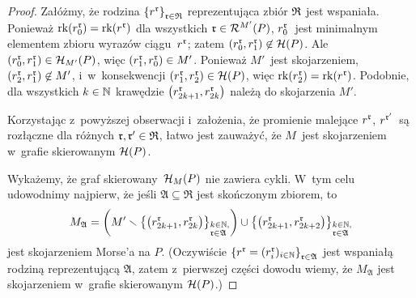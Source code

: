 \begin{proof}
Załóżmy, że rodzina $\left\{r^{\mathfrak{r}}\right\}_{\mathfrak{r}\in\mathfrak{R}}$ reprezentująca zbiór $\mathfrak{R}$ jest wspaniała. Ponieważ $\operatorname{rk}(r^{\mathfrak{r}}_0)=\operatorname{rk}(r^{\mathfrak{r}})$ dla wszystkich $\mathfrak{r}\in\mathcal{R}^{M'}(P)$, $r^{\mathfrak{r}}_0$~jest minimalnym elementem zbioru wyrazów ciągu~$r^{\mathfrak{r}}$; zatem $(r^{\mathfrak{r}}_0,r^{\mathfrak{r}}_1)\not\in\mathcal{H}(P)$. Ale $(r^{\mathfrak{r}}_0,r^{\mathfrak{r}}_1)\in\mathcal{H}_{M'}(P)$, więc $(r^{\mathfrak{r}}_1,r^{\mathfrak{r}}_0)\in M'$. Ponieważ $M'$~jest skojarzeniem, $(r^{\mathfrak{r}}_2,r^{\mathfrak{r}}_1)\not\in M'$, i~w~konsekwencji $(r^{\mathfrak{r}}_1,r^{\mathfrak{r}}_2)\in\mathcal{H}(P)$, więc $\operatorname{rk}(r^{\mathfrak{r}}_2)=\operatorname{rk}(r^{\mathfrak{r}})$. Podobnie, dla wszystkich $k\in\mathbb{N}$ krawędzie $\left(r^{\mathfrak{r}}_{2k+1}, r^{\mathfrak{r}}_{2k}\right)$ należą do skojarzenia $M'$. 

Korzystając z~powyższej obserwacji i~założenia, że promienie malejące $r^{\mathfrak{r}}$, $r^{\mathfrak{r}'}$~są rozłączne dla różnych $\mathfrak{r},\mathfrak{r}'\in\mathfrak{R}$, łatwo jest zauważyć, że $M$~jest skojarzeniem w~grafie skierowanym $\mathcal{H}(P)$.

Wykażemy, że graf skierowany~$\mathcal{H}_{M}(P)$ nie zawiera cykli. W~tym celu udowodnimy najpierw, że jeśli $\mathfrak{A}\subseteq \mathfrak{R}$ jest skończonym zbiorem, to 
\[M_{\mathfrak{A}}=\left(M'\smallsetminus \left\{\left(r^{\mathfrak{r}}_{2k+1}, r^{\mathfrak{r}}_{2k}\right)\right\}_{\begin{subarray}{l}k\in\mathbb{N},\\ \mathfrak{r}\in\mathfrak{A}\end{subarray}}\right) \cup \left\{\left(r^{\mathfrak{r}}_{2k+1}, r^{\mathfrak{r}}_{2k+2}\right)\right\}_{\begin{subarray}{l}k\in\mathbb{N},\\ \mathfrak{r}\in\mathfrak{A}\end{subarray}}\]
jest skojarzeniem Morse'a na $P$. (Oczywiście $\left\{r^{\mathfrak{r}}=(r^{\mathfrak{r}}_i)_{i\in\mathbb{N}}\right\}_{\mathfrak{r}\in\mathfrak{A}}$ jest wspaniałą rodziną reprezentującą $\mathfrak{A}$, zatem z~pierwszej części dowodu wiemy, że $M_{\mathfrak{A}}$ jest skojarzeniem w~grafie skierowanym $\mathcal{H}(P)$.)


\end{proof}
